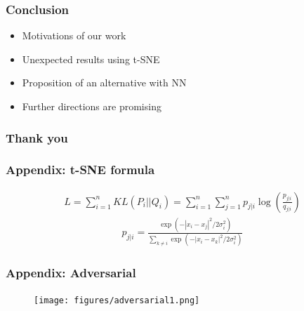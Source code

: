 \documentclass[10pt]{beamer}
\begin{document}
\begin{frame}
    \frametitle{Conclusion}
    \begin{itemize}
        \item Motivations of our work
        \item Unexpected results using t-SNE
        \item Proposition of an alternative with NN
        \item Further directions are promising
    \end{itemize}
\end{frame}

\begin{frame}
    \frametitle{Thank you}
\end{frame}


\begin{frame}
    \frametitle{Appendix: t-SNE formula}
    \begin{eqnarray}
        L = \sum_{i=1}^n KL(P_i || Q_i) = \sum_{i=1}^n \sum_{j=1}^n p_{j|i} \log\left(\frac{p_{j|i}}{q_{j|i}}\right)
    \end{eqnarray}
    \begin{eqnarray}
        p_{j|i} = \frac{\exp(-|x_i - x_j|^2 / 2 \sigma_i^2)}{\sum_{k \not = i} \exp(-|x_i - x_k|^2 / 2 \sigma_i^2 )}
        \end{eqnarray}
\end{frame}

\begin{frame}
    \frametitle{Appendix: Adversarial}
    \begin{figure}[h]
        \begin{center}
            \texttt{[image: figures/adversarial1.png]}
        \end{center}
    \end{figure}
\end{frame}
\end{document}
